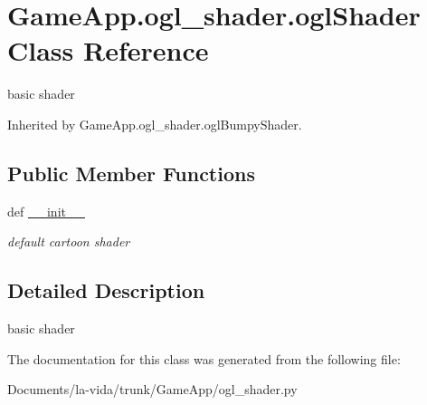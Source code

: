 \hypertarget{classGameApp_1_1ogl__shader_1_1oglShader}{
\section{GameApp.ogl\_\-shader.oglShader Class Reference}
\label{classGameApp_1_1ogl__shader_1_1oglShader}
}
basic shader  


Inherited by GameApp.ogl\_\-shader.oglBumpyShader.

\subsection*{Public Member Functions}
\begin{CompactItemize}
\item 
\hypertarget{classGameApp_1_1ogl__shader_1_1oglShader_f0562182b1f30be258a943e65a9db9ce}{
def \hyperlink{classGameApp_1_1ogl__shader_1_1oglShader_f0562182b1f30be258a943e65a9db9ce}{\_\-\_\-init\_\-\_\-}}
\label{classGameApp_1_1ogl__shader_1_1oglShader_f0562182b1f30be258a943e65a9db9ce}

\begin{CompactList}\small\item\em default cartoon shader \item\end{CompactList}\end{CompactItemize}


\subsection{Detailed Description}
basic shader 

The documentation for this class was generated from the following file:\begin{CompactItemize}
\item 
Documents/la-vida/trunk/GameApp/ogl\_\-shader.py\end{CompactItemize}
